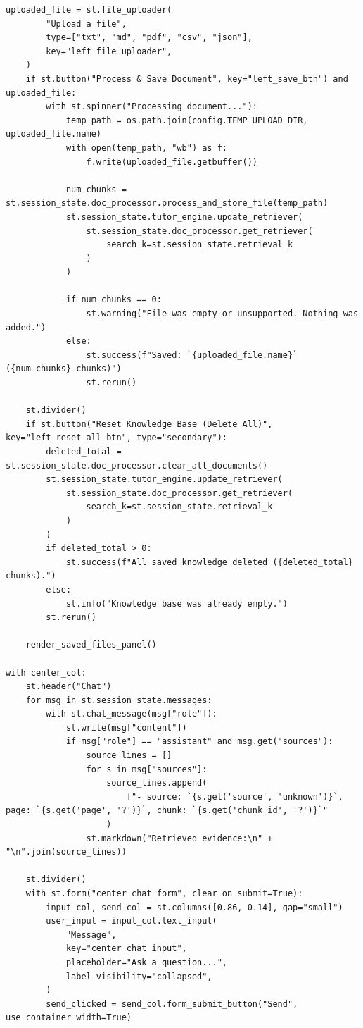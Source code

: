 \documentclass[12pt,a4paper]{article}
\begin{document}
\begin{lstlisting}[caption={evaluation.py}]
    uploaded_file = st.file_uploader(
        "Upload a file",
        type=["txt", "md", "pdf", "csv", "json"],
        key="left_file_uploader",
    )
    if st.button("Process & Save Document", key="left_save_btn") and uploaded_file:
        with st.spinner("Processing document..."):
            temp_path = os.path.join(config.TEMP_UPLOAD_DIR, uploaded_file.name)
            with open(temp_path, "wb") as f:
                f.write(uploaded_file.getbuffer())

            num_chunks = st.session_state.doc_processor.process_and_store_file(temp_path)
            st.session_state.tutor_engine.update_retriever(
                st.session_state.doc_processor.get_retriever(
                    search_k=st.session_state.retrieval_k
                )
            )

            if num_chunks == 0:
                st.warning("File was empty or unsupported. Nothing was added.")
            else:
                st.success(f"Saved: `{uploaded_file.name}` ({num_chunks} chunks)")
                st.rerun()

    st.divider()
    if st.button("Reset Knowledge Base (Delete All)", key="left_reset_all_btn", type="secondary"):
        deleted_total = st.session_state.doc_processor.clear_all_documents()
        st.session_state.tutor_engine.update_retriever(
            st.session_state.doc_processor.get_retriever(
                search_k=st.session_state.retrieval_k
            )
        )
        if deleted_total > 0:
            st.success(f"All saved knowledge deleted ({deleted_total} chunks).")
        else:
            st.info("Knowledge base was already empty.")
        st.rerun()

    render_saved_files_panel()

with center_col:
    st.header("Chat")
    for msg in st.session_state.messages:
        with st.chat_message(msg["role"]):
            st.write(msg["content"])
            if msg["role"] == "assistant" and msg.get("sources"):
                source_lines = []
                for s in msg["sources"]:
                    source_lines.append(
                        f"- source: `{s.get('source', 'unknown')}`, page: `{s.get('page', '?')}`, chunk: `{s.get('chunk_id', '?')}`"
                    )
                st.markdown("Retrieved evidence:\n" + "\n".join(source_lines))

    st.divider()
    with st.form("center_chat_form", clear_on_submit=True):
        input_col, send_col = st.columns([0.86, 0.14], gap="small")
        user_input = input_col.text_input(
            "Message",
            key="center_chat_input",
            placeholder="Ask a question...",
            label_visibility="collapsed",
        )
        send_clicked = send_col.form_submit_button("Send", use_container_width=True)


\end{lstlisting}
\end{document}
